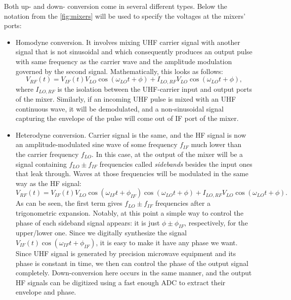 Both up- and down- conversion come in several different types. Below the notation from the \autoref{fig:mixers} will be used to specify the voltages at the mixers' ports:
\begin{itemize}[topsep=5pt, itemsep=5pt]
\item Homodyne conversion. It involves mixing UHF carrier signal with another signal that is not sinusoidal and which consequently produces an output pulse with same frequency as the carrier wave and the amplitude modulation governed by the second signal. Mathematically, this looks as follows:
\[
V_{RF}(t) = V_{IF}(t) V_{LO} \cos(\omega_{LO} t + \phi) + I_{LO, RF}V_{LO} \cos(\omega_{LO} t + \phi),
\]
where $I_{LO, RF}$ is the isolation between the UHF-carrier input and output ports of the mixer. Similarly, if an incoming UHF pulse is mixed with an UHF continuous wave, it will be demodulated, and a non-sinusoidal signal capturing the envelope of the pulse will come out of IF port of the mixer. 

\item Heterodyne conversion. Carrier signal is the same, and the HF signal is now an amplitude-modulated sine wave of some frequency $f_{IF}$ much lower than the carrier frequency $f_{LO}$. In this case, at the output of the mixer will be a signal containing $f_{LO} \pm f_{IF}$ frequencies called \textit{sidebands} besides the input ones that leak through. Waves at those frequencies will be modulated in the same way as the HF signal:
\[
V_{RF}(t) = V_{IF}(t) V_{LO}\cos(\omega_{IF}t+\phi_{IF}) \cos(\omega_{LO} t + \phi) + I_{LO, RF} V_{LO} \cos(\omega_{LO} t + \phi).
\]
As can be seen, the first term gives $f_{LO} \pm f_{IF}$ frequencies after a trigonometric expansion. Notably, at this point a simple way to control the phase of each sideband signal appears: it is just $\phi\pm\phi_{IF}$, respectively, for the upper/lower one. Since we digitally synthesize the signal $V_{IF}(t)\cos(\omega_{IF}t+\phi_{IF})$, it is easy to make it have any phase we want. Since UHF signal is generated by precision microwave equipment and its phase is constant in time, we then can control the phase of the output signal completely. Down-conversion here occurs in the same manner, and the output HF signals can be digitized using a fast enough ADC to extract their envelope and phase. 


\end{itemize}
